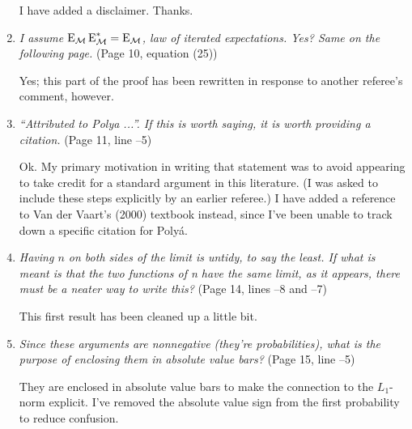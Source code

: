\documentclass[12pt]{article}
\begin{document}
\begin{enumerate}
  I have added a disclaimer. Thanks.

\item \emph{I assume $\operatorname{E}_{\mathcal{M}} \operatorname{E}_{\mathcal{M}}^* = \operatorname{E}_{\mathcal{M}}$, law of iterated
    expectations. Yes?  Same on the following page.} (Page 10, equation (25))

  Yes; this part of the proof has been rewritten in response to
  another referee's comment, however.

\item \emph{``Attributed to Polya ...''. If this is worth saying, it
    is worth providing a citation.} (Page 11, line --5)

  Ok. My primary motivation in writing that statement was to avoid
  appearing to take credit for a standard argument in this
  literature. (I was asked to include these steps explicitly by an
  earlier referee.)  I have added a reference to Van der Vaart's
  (2000) textbook instead, since I've been unable to track down a
  specific citation for Poly\'a.


\item \emph{Having $n$ on both sides of the limit is untidy, to say
    the least. If what is meant is that the two functions of n have
    the same limit, as it appears, there must be a neater way to write
    this?} (Page 14, lines --8 and --7)

  This first result has been cleaned up a little bit.

\item \emph{Since these arguments are nonnegative (they're
    probabilities), what is the purpose of enclosing them in absolute
    value bars?} (Page 15, line --5)

  They are enclosed in absolute value bars to make the connection to the
  $L_{1}$-norm explicit. I've removed the absolute value sign from the first
  probability to reduce confusion.

\end{enumerate}
\end{document}
